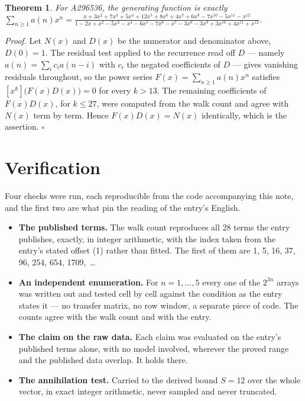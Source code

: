 \documentclass[11pt]{article}
\newtheorem{theorem}{Theorem}
\theoremstyle{definition}
\begin{document}
\begin{theorem} For A296536, the generating function is exactly $\sum_{n\ge 1} a(n)x^n = \frac{x + 3x^{2} + 7x^{3} + 5x^{4} + 12x^{5} + 8x^{6} + 4x^{7} + 6x^{8} - 7x^{10} - 5x^{11} - x^{12}}{1 - 2x + x^{2} - 5x^{3} - x^{4} - 6x^{5} - 7x^{6} - x^{7} - 3x^{8} - 3x^{9} + 3x^{10} + 4x^{11} + x^{12}}$.\end{theorem}

{\itshape Proof.} Let $N(x)$ and $D(x)$ be the numerator and denominator above, $D(0)=1$. The residual test applied to the recurrence read off $D$ --- namely $a(n) = \sum_i c_i a(n-i)$ with $c_i$ the negated coefficients of $D$ --- gives vanishing residuals throughout, so the power series $F(x)=\sum_{n\ge 1}a(n)x^n$ satisfies $[x^k]\bigl(F(x)D(x)\bigr) = 0$ for every $k > 13$. The remaining coefficients of $F(x)D(x)$, for $k \le 27$, were computed from the walk count and agree with $N(x)$ term by term. Hence $F(x)D(x) = N(x)$ identically, which is the assertion. $\square$

\section{Verification}

Four checks were run, each reproducible from the code accompanying this note, and the first two are what pin the reading of the entry's English.

\begin{itemize}

\item {\bfseries The published terms.} The walk count reproduces all 28 terms the entry publishes, exactly, in integer arithmetic, with the index taken from the entry's stated offset (1) rather than fitted. The first of them are 1, 5, 16, 37, 96, 254, 654, 1709,~\dots

\item {\bfseries An independent enumeration.} For $n = 1,\dots,5$ every one of the $2^{3n}$ arrays was written out and tested cell by cell against the condition as the entry states it --- no transfer matrix, no row window, a separate piece of code. The counts agree with the walk count and with the entry.

\item {\bfseries The claim on the raw data.} Each claim was evaluated on the entry's published terms alone, with no model involved, wherever the proved range and the published data overlap. It holds there.

\item {\bfseries The annihilation test.} Carried to the derived bound $S = 12$ over the whole vector, in exact integer arithmetic, never sampled and never truncated.

\end{itemize}
\end{document}
